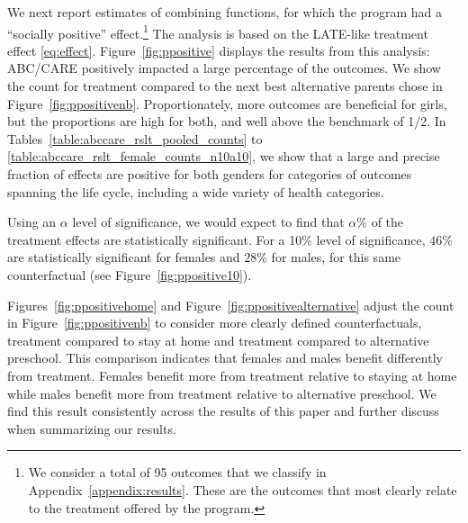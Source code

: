We next report estimates of  combining functions, for which the program had a ``socially positive'' effect.\footnote{We consider a total of 95 outcomes that we classify in Appendix~\ref{appendix:results}. These are the outcomes that most clearly relate to the treatment offered by the program.} The analysis is based on the LATE-like treatment effect \eqref{eq:effect}. Figure~\ref{fig:ppositive} displays the results from this analysis: ABC/CARE positively impacted a large percentage of the outcomes. We show the count for treatment compared to the next best alternative parents chose in Figure~\ref{fig:ppositivenb}. Proportionately, more outcomes are beneficial for girls, but the proportions are high for both, and well above the benchmark of 1/2. In Tables~\ref{table:abccare_rslt_pooled_counts} to \ref{table:abccare_rslt_female_counts_n10a10}, we show that a large and precise fraction of effects are positive for both genders for categories of outcomes spanning the life cycle, including a wide variety of health categories.

Using an $\alpha$ level of significance, we would expect to find that $\alpha\%$ of the treatment effects are statistically significant. For a 10\% level of significance, $46\%$ are statistically significant for females and $28\%$ for males, for this same counterfactual (see Figure~\ref{fig:ppositive10}).

Figures~\ref{fig:ppositivehome} and Figure~\ref{fig:ppositivealternative} adjust the count in Figure~\ref{fig:ppositivenb} to consider more clearly defined counterfactuals, treatment compared to stay at home and treatment compared to alternative preschool. This comparison indicates that females and males benefit differently from treatment. Females benefit more from treatment relative to staying at home while males benefit more from treatment relative to alternative preschool. We find this result consistently across the results of this paper and further discuss when summarizing our results.

